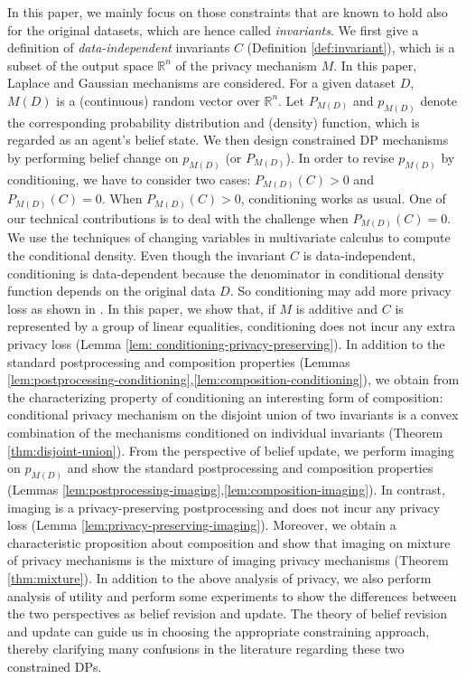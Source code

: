 \documentclass[11pt]{article}
\begin{document}
 In this paper, we mainly focus on those constraints that are known to hold also for the original datasets, which are hence called \emph{invariants}. We first give a definition of \emph{data-independent} invariants $C$ (Definition \ref{def:invariant}), which is a subset of the output space $\mathbb{R}^n$ of the privacy mechanism $M$.  In this paper, Laplace and Gaussian mechanisms are considered.  For a given dataset $D$, $M(D)$ is a (continuous) random vector over $\mathbb{R}^n$. Let $P_{M(D)}$ and $p_{M(D)}$ denote the corresponding probability distribution and (density) function, which is regarded as an agent's belief state. We then design constrained DP mechanisms by performing belief change on $p_{M(D)}$ (or $P_{M(D)}$). In order to revise $p_{M(D)}$  by conditioning, we have to consider two cases: $P_{M(D)}(C) >0$ and $P_{M(D)}(C)=0$.  When $P_{M(D)}(C) >0$, conditioning works as usual.  One of our technical contributions is to deal with the challenge when $P_{M(D)}(C) = 0$. We use the techniques of changing variables in multivariate calculus to compute the conditional density.  Even though the invariant $C$ is data-independent, conditioning is data-dependent  because the denominator in conditional density function depends on the original data $D$. So conditioning may add more privacy loss as shown in \cite{GongM20}. In this paper, we show that, if $M$ is additive and $C$ is represented by a group of linear equalities, conditioning does not incur any extra privacy loss (Lemma \ref{lem: conditioning-privacy-preserving}).  In addition to the standard postprocessing and composition properties (Lemmas \ref{lem:postprocessing-conditioning},\ref{lem:composition-conditioning}), we obtain from the characterizing property of conditioning an interesting form of composition: conditional privacy mechanism on the disjoint union of two invariants is a convex combination of the mechanisms conditioned on individual invariants (Theorem \ref{thm:disjoint-union}).  From the perspective of belief update, we perform imaging on $p_{M(D)}$ and show the standard postprocessing and composition properties (Lemmas \ref{lem:postprocessing-imaging},\ref{lem:composition-imaging}).  In contrast, imaging is a privacy-preserving postprocessing and does not incur any privacy loss (Lemma \ref{lem:privacy-preserving-imaging}). Moreover, we obtain a characteristic proposition about composition and show that imaging on mixture of privacy mechanisms is the mixture of imaging privacy mechanisms (Theorem \ref{thm:mixture}).  In addition to the above analysis of privacy, we also perform analysis of utility and perform some experiments to show the differences between the two perspectives as belief revision and update.   The theory of belief revision and update can guide us in choosing the appropriate constraining approach, thereby clarifying many confusions in the literature regarding these two constrained DPs.
\end{document}

